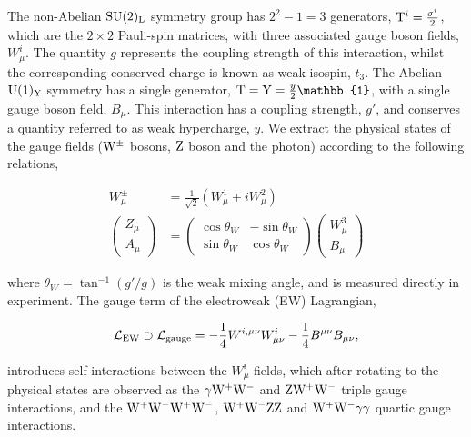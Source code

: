 \noindent
The non-Abelian ${\rm{SU}}(2)_{\rm{L}}$ symmetry group has $2^2-1=3$ generators, ${\rm{T}}^i=\frac{\sigma^i}{2}$, which are the $2\times2$ Pauli-spin matrices, with three associated gauge boson fields, $W^i_\mu$. The quantity $g$ represents the coupling strength of this interaction, whilst the corresponding conserved charge is known as weak isospin, $t_3$. The Abelian ${\rm{U}}(1)_{\rm{Y}}$ symmetry has a single generator, ${\rm{T}}={\rm{Y}}=\frac{y}{2}\mathbb{1}$, with a single gauge boson field, $B_\mu$. This interaction has a coupling strength, $g'$, and conserves a quantity referred to as weak hypercharge, $y$. We extract the physical states of the gauge fields (${\rm{W}}^\pm$ bosons, ${\rm{Z}}$ boson and the photon) according to the following relations,

\begin{equation}\label{eq:ew_rotation}
\begin{split}
    W^{\pm}_\mu &= \frac{1}{\sqrt{2}}(W_\mu^1 \mp iW_\mu^2) \\
    \begin{pmatrix}
    Z_\mu \\
    A_\mu
    \end{pmatrix} 
    &= 
    \begin{pmatrix}
    \cos{\theta_W} & -\sin{\theta_W} \\
    \sin{\theta_W} & \cos{\theta_W}
    \end{pmatrix} 
    \begin{pmatrix}
    W^3_\mu \\
    B_\mu
    \end{pmatrix}
\end{split}
\end{equation}

\noindent
where $\theta_W=\tan^{-1}(g'/g)$ is the weak mixing angle, and is measured directly in experiment. The gauge term of the electroweak (EW) Lagrangian,

\begin{equation}
    \mathcal{L}_{\rm{EW}} \supset \mathcal{L}_{\rm{gauge}} = -\frac{1}{4}W^{i,\mu\nu}W^i_{\mu\nu} - \frac{1}{4}B^{\mu\nu}B_{\mu\nu},
\end{equation}

\noindent
introduces self-interactions between the $W^i_\mu$ fields, which after rotating to the physical states are observed as the $\gamma\rm{W^+W^-}$ and ${\rm{Z W^+W^-}}$ triple gauge interactions, and the $\rm{W^+W^-W^+W^-}$, $\rm{W^+W^-ZZ}$ and ${\rm{W^+W^-}}\gamma\gamma$ quartic gauge interactions.

